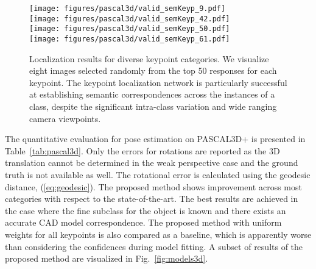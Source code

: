 \documentclass[letterpaper, 10 pt, conference]{ieeeconf}
\begin{document}
\begin{figure*}
  \centering
  \texttt{[image: figures/pascal3d/valid\_semKeyp\_9.pdf]}\\
  \texttt{[image: figures/pascal3d/valid\_semKeyp\_42.pdf]}\\
  \texttt{[image: figures/pascal3d/valid\_semKeyp\_50.pdf]}\\
  \texttt{[image: figures/pascal3d/valid\_semKeyp\_61.pdf]}\\
  \caption{Localization results for diverse keypoint categories. We visualize eight images selected randomly from the top 50 responses for each keypoint. The keypoint localization network is particularly successful at establishing semantic correspondences across the instances of a class, despite the significant intra-class variation and wide ranging camera viewpoints.}\label{fig:semantic}
\end{figure*}

\vspace{5pt} The quantitative evaluation for pose estimation on PASCAL3D+ is presented in Table~\ref{tab:pascal3d}. Only the errors for rotations are reported as the 3D translation cannot be determined in the weak perspective case and the ground truth is not available as well. The rotational error is calculated using the geodesic distance, (\ref{eq:geodesic}). The proposed method shows improvement across most categories with respect to the state-of-the-art. The best results are achieved in the case where the fine subclass for the object is known and there exists an accurate CAD model correspondence. The proposed method with uniform weights for all keypoints is also compared as a baseline, which is apparently worse than considering the confidences during model fitting. A subset of results of the proposed method are visualized in Fig.~\ref{fig:models3d}.
\end{document}
